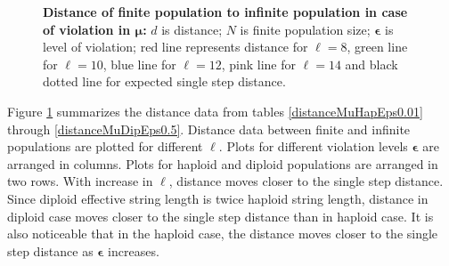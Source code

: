 \begin{figure}[h]
\begin{center}
\hspace{-3em}%
\caption[\textbf{Distance of finite population to infinite population in case of violation in $\bm{\mu}$}]{\textbf{Distance of finite population to infinite population in case of violation in $\bm{\mu}$:}  
  $d$ is distance; $N$ is finite population size; $\bm{\epsilon}$ is level of violation;
  red line represents distance for $\ell = 8$, green line for $\ell = 10$, blue line for $\ell = 12$, pink line for $\ell = 14$ 
  and black dotted line for expected single step distance.}
\label{vio_mu_dist}
\end{center}
\end{figure}
Figure \ref{vio_mu_dist} summarizes the distance data from tables \ref{distanceMuHapEps0.01} through  
\ref{distanceMuDipEps0.5}. Distance data between finite and infinite populations are plotted for different $\ell$. 
Plots for different violation levels $\bm{\epsilon}$ are arranged in columns. 
Plots for haploid and diploid populations are arranged in two rows. With increase in $\ell$, 
distance moves closer to the single step distance. Since diploid effective  
string length is twice haploid string length, 
distance in diploid case moves closer to the single step distance than in haploid case. 
It is also noticeable that in the haploid case, 
the distance moves closer to the single step distance as $\bm{\epsilon}$ increases.

